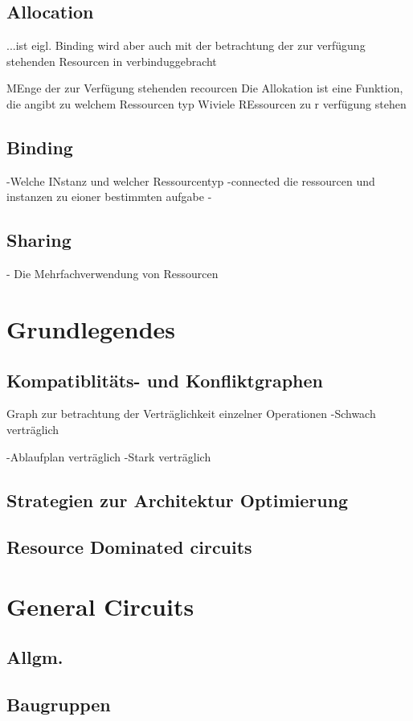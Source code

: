 \documentclass[conference]{IEEEtran}
\begin{document}
\subsection{Allocation}

...ist eigl. Binding wird aber auch mit der betrachtung der zur verfügung stehenden Resourcen in verbinduggebracht 

MEnge der zur Verfügung stehenden recourcen 
Die Allokation ist eine Funktion, die angibt zu welchem Ressourcen typ Wiviele REssourcen zu r verfügung stehen 

\subsection{Binding}
-Welche INstanz und welcher Ressourcentyp
-connected die ressourcen und instanzen zu eioner bestimmten aufgabe 
-
\subsection{Sharing}
- Die Mehrfachverwendung von Ressourcen 
\section{Grundlegendes}
\subsection{Kompatiblitäts- und Konfliktgraphen}
Graph zur betrachtung der Verträglichkeit einzelner Operationen
-Schwach verträglich

-Ablaufplan verträglich
-Stark verträglich

\subsection{Strategien zur Architektur Optimierung}
\subsection{Resource Dominated circuits}
\section{General Circuits}
\subsection{Allgm.}
\subsection{Baugruppen}
\end{document}
